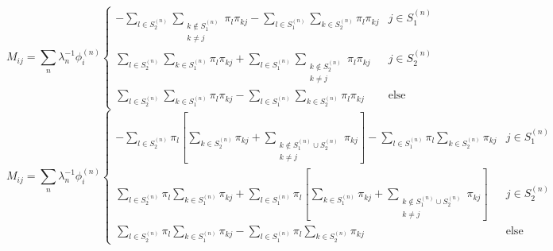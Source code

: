 \documentclass[a4paper]{article}
\newcommand{\evec}[2]{\phi^{(#2)}_{#1}}
\begin{document}
\begin{equation}
M_{ij} = \sum_n \lambda_n^{-1} \evec{i}{n} 
\begin{cases}
- \sum_{l \in S_2^{(n)}} 
   \sum_{\substack{k \notin S_1^{(n)} \\ k \ne j}} 
  \pi_l \pi_{kj}
  - \sum_{l \in S_1^{(n)}} \sum_{k \in S_2^{(n)}}  \pi_l \pi_{kj}
 & j \in S_1^{(n)} \\
\sum_{l \in S_2^{(n)}} \sum_{k \in S_1^{(n)}}  \pi_l \pi_{kj}
+  \sum_{l \in S_1^{(n)}} 
   \sum_{\substack{k \notin S_2^{(n)} \\ k \ne j}} 
  \pi_l \pi_{kj}
& j \in S_2^{(n)} \\
\sum_{l \in S_2^{(n)}} \sum_{k \in S_1^{(n)}}  \pi_l \pi_{kj}
- 
\sum_{l \in S_1^{(n)}} \sum_{k \in S_2^{(n)}} \pi_l  \pi_{kj}
& \text{else}
\end{cases}
\end{equation}
\begin{equation}
M_{ij} = \sum_n \lambda_n^{-1} \evec{i}{n} 
\begin{cases}
-\sum_{l \in S_2^{(n)}} \pi_l
  \left[
  \sum_{k \in S_2^{(n)}} 
  \pi_{kj}
  +
  \sum_{\substack{k \notin S_1^{(n)} \cup S_2^{(n)} \\ k \ne j}} 
  \pi_{kj}
  \right]
  - \sum_{l \in S_1^{(n)}} \pi_l \sum_{k \in S_2^{(n)}}  \pi_{kj}
 & j \in S_1^{(n)} \\
\sum_{l \in S_2^{(n)}} \pi_l \sum_{k \in S_1^{(n)}}  \pi_{kj}
+  \sum_{l \in S_1^{(n)}} \pi_l 
\left[
  \sum_{k \in S_1^{(n)}} 
  \pi_{kj}
  +
  \sum_{\substack{k \notin S_1^{(n)} \cup S_2^{(n)}  \\ k \ne j}} 
  \pi_{kj}
  \right]
& j \in S_2^{(n)} \\
\sum_{l \in S_2^{(n)}} \pi_l \sum_{k \in S_1^{(n)}}  \pi_{kj}
- 
\sum_{l \in S_1^{(n)}} \pi_l \sum_{k \in S_2^{(n)}}  \pi_{kj}
& \text{else}
\end{cases}
\end{equation}
\end{document}
